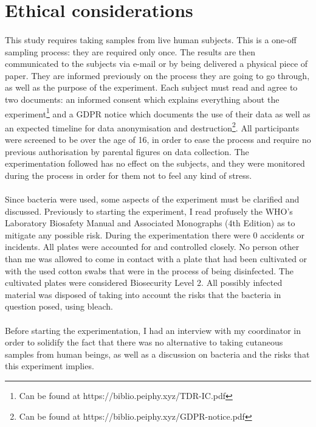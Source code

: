 \section{Ethical considerations}
\paragraph{}This study requires taking samples from live human subjects. This is a one-off sampling process: they are required only once. The results are then communicated to the subjects via e-mail or by being delivered a physical piece of paper. They are informed previously on the process they are going to go through, as well as the purpose of the experiment. Each subject must read and agree to two documents: an informed consent which explains everything about the experiment\footnote{Can be found at https://biblio.peiphy.xyz/TDR-IC.pdf} and a GDPR notice which documents the use of their data as well as an expected timeline for data anonymisation and destruction\footnote{Can be found at https://biblio.peiphy.xyz/GDPR-notice.pdf}. All participants were screened to be over the age of 16, in order to ease the process and require no previous authorisation by parental figures on data collection. The experimentation followed has no effect on the subjects, and they were monitored during the process in order for them not to feel any kind of stress.
\paragraph{}Since bacteria were used, some aspects of the experiment must be clarified and discussed. Previously to starting the experiment, I read profusely the WHO's Laboratory Biosafety Manual and Associated Monographs (4th Edition) as to mitigate any possible risk. During the experimentation there were 0 accidents or incidents. All plates were accounted for and controlled closely. No person other than me was allowed to come in contact with a plate that had been cultivated or with the used cotton swabs that were in the process of being disinfected. The cultivated plates were considered Biosecurity Level 2. All possibly infected material was disposed of taking into account the risks that the bacteria in question posed, using bleach.
\paragraph{}Before starting the experimentation, I had an interview with my coordinator in order to solidify the fact that there was no alternative to taking cutaneous samples from human beings, as well as a discussion on bacteria and the risks that this experiment implies.